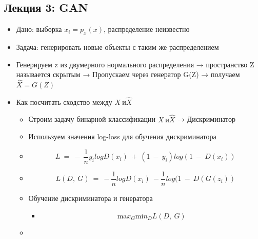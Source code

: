 \documentclass[a4paper, 12pt]{article}
\begin{document}
\subsection{Лекция 3: GAN}
\begin{itemize}
\item
  
  Дано: выборка \(x_{i} = p_{x}(x)\), распределение неизвестно
  
\item
  
  Задача: генерировать новые объекты с таким же распределением
  
\item
  
  Генерируем z из двумерного нормального распределения → пространство Z
  называется {скрытым} → Пропускаем через генератор G(Z) → получаем
  \(\widehat{X} = G(Z)\)
  
\item
  
  Как посчитать сходство между \(X\ \text{и} \widehat{X}\)
  

  \begin{itemize}
  \item
    
    Строим задачу бинарной классификации \(X\ \text{и} \widehat{X}\) →
    {Дискриминатор}
    
  \item
    
    Используем значения log-loss для обучения дискриминатора
    
  \item
    
    \[L\  = \  - \ \frac{1}{n}y_{i}logD(x_{i})\  + \ (1\  - \ y_{i})log(1\  - \ D(x_{i}))\]
    
  \item
    
    \[L(D,\ G)\  = \  - \frac{1}{n}logD(x_{i})\  - \frac{1}{n}log(1\  - \ D(G(z_{i}))\]
    
  \item
    
    Обучение дискриминатора и генератора
    

    \begin{itemize}
    \item
      
      \[\text{ma}x_{G}\text{mi}n_{D}L(D,\ G)\]
      
    \end{itemize}
  \item
    

\end{itemize}
\end{itemize}
\end{document}
